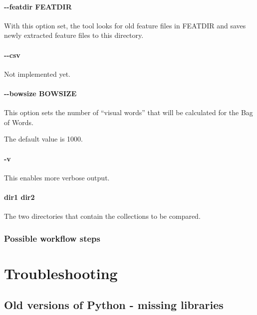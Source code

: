 \documentclass{hitec}
\begin{document}

\paragraph{\ttfamily -{}-featdir FEATDIR}

With this option set, the tool looks for old feature files in FEATDIR and saves
newly extracted feature files to this directory.

\paragraph{\ttfamily -{}-csv}

Not implemented yet.

\paragraph{\ttfamily -{}-bowsize BOWSIZE}

This option sets the number of ``visual words'' that will be
calculated for the Bag of Words.

The default value is 1000.

\paragraph{\ttfamily -v}

This enables more verbose output.

\paragraph{\ttfamily dir1 dir2}

The two directories that contain the collections to be compared.

\subsubsection*{Possible workflow steps}


\appendix

\section{Troubleshooting}

\subsection{Old versions of Python - missing libraries}
\end{document}
